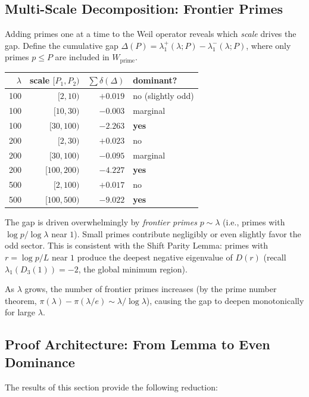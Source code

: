 \documentclass[12pt,a4paper]{article}
\theoremstyle{definition}
\theoremstyle{remark}
\begin{document}
\subsection{Multi-Scale Decomposition: Frontier Primes}
\label{sec:frontier}

Adding primes one at a time to the Weil operator reveals which \emph{scale} drives the gap. Define the cumulative gap $\Delta(P) = \lambda_1^+(\lambda; P) - \lambda_1^-(\lambda; P)$, where only primes $p \leq P$ are included in $W_{\mathrm{prime}}$.

\begin{center}
\renewcommand{\arraystretch}{1.15}
\begin{tabular}{r|r|r|l}
$\lambda$ & scale $[P_1, P_2)$ & $\sum \delta(\Delta)$ & dominant? \\\hline
100 & $[2, 10)$ & $+0.019$ & no (slightly odd) \\
100 & $[10, 30)$ & $-0.003$ & marginal \\
100 & $[30, 100)$ & $-2.263$ & \textbf{yes} \\[3pt]
200 & $[2, 30)$ & $+0.023$ & no \\
200 & $[30, 100)$ & $-0.095$ & marginal \\
200 & $[100, 200)$ & $-4.227$ & \textbf{yes} \\[3pt]
500 & $[2, 100)$ & $+0.017$ & no \\
500 & $[100, 500)$ & $-9.022$ & \textbf{yes}
\end{tabular}
\end{center}

The gap is driven overwhelmingly by \emph{frontier primes} $p \sim \lambda$ (i.e., primes with $\log p / \log\lambda$ near $1$). Small primes contribute negligibly or even slightly favor the odd sector. This is consistent with the Shift Parity Lemma: primes with $r = \log p / L$ near $1$ produce the deepest negative eigenvalue of $D(r)$ (recall $\lambda_1(D_3(1)) = -2$, the global minimum region).

As $\lambda$ grows, the number of frontier primes increases (by the prime number theorem, $\pi(\lambda) - \pi(\lambda/e) \sim \lambda/\log\lambda$), causing the gap to deepen monotonically for large $\lambda$.

\subsection{Proof Architecture: From Lemma to Even Dominance}

The results of this section provide the following reduction:
\end{document}
